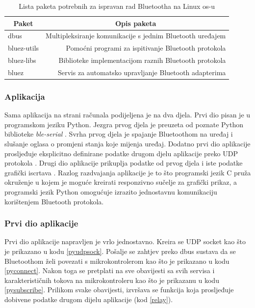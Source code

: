 \documentclass[times, utf8, diplomski]{diplomski}
\begin{document}
\begin{table}[H]
  \begin{center}
    \begin{tabular}[c]{l|r}
      \multicolumn{1}{c|}{\textbf{Paket}} & 
      \multicolumn{1}{c}{\textbf{Opis paketa}} \\
      \hline
      dbus & Multipleksiranje komunikacije s jednim Bluetooth uređajem \\
      bluez-utils & Pomoćni programi za ispitivanje Bluetooth protokola \\
      bluez-libs & Biblioteke implementacijom raznih Bluetooth protokola \\
      bluez & Servis za automatsko upravljanje Bluetooth adapterima \\
      \hline
    \end{tabular}
  \caption{Lista paketa potrebnih za ispravan rad Bluetootha na Linux os-u}
  \end{center}
\end{table}

\subsubsection{Aplikacija}
Sama aplikacija na strani računala podijeljena je na dva djela. Prvi dio pisan je u programskom jeziku Python. Jezgra prvog djela je preuzeta od poznate Python biblioteke \textit{ble-serial} \cite{ble-serial}. Svrha prvog djela je spajanje Bluetoothom na uređaj i slušanje oglasa o promjeni stanja koje mijenja uređaj. Dodatno prvi dio aplikacije prosljeđuje eksplicitno definirane podatke drugom djelu aplikacije preko UDP protokola \cite{firstPart}. Drugi dio aplikacije prikuplja podatke od prvog djela i iste podatke grafički iscrtava \cite{secondPart}. Razlog razdvajanja aplikacije je to što programski jezik C pruža okruženje u kojem je moguće kreirati responzivno sučelje za grafički prikaz, a programski jezik Python omogućuje izrazito jednostavnu komunikaciju korištenjem Bluetooth protokola.

\subsubsection{Prvi dio aplikacije}
Prvi dio aplikacije napravljen je vrlo jednostavno. Kreira se UDP socket kao što je prikazano u kodu \ref{pyudpsock}. Pošalje se zahtjev preko dbus sustava da se Bluetoothom želi povezati s mikrokontrolerom kao što je prikazano u kodu \ref{pyconnect}. Nakon toga se pretplati na sve obavijesti sa svih servisa i karakterističnih tokova na mikrokontroleru kao što je prikazanu u kodu \ref{pysubscribe}. Prilikom svake obavijesti, izvršava se funkcija koja prosljeđuje dobivene podatke drugom dijelu aplikacije (kod \ref{relay}).
\end{document}
